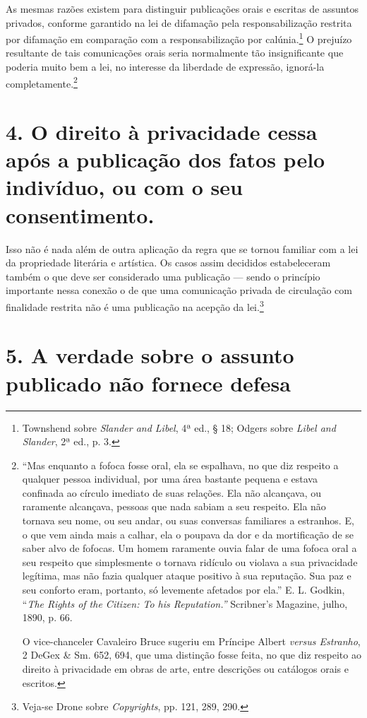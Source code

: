As mesmas razões existem para distinguir publicações orais e escritas de
assuntos privados, conforme garantido na lei de difamação pela
responsabilização restrita por difamação em comparação com a
responsabilização por calúnia.\footnote{Townshend sobre \emph{Slander
  and Libel}, 4ª ed., § 18; Odgers sobre \emph{Libel and Slander}, 2ª
  ed., p. 3.} O prejuízo resultante de tais comunicações orais seria
normalmente tão insignificante que poderia muito bem a lei, no interesse
da liberdade de expressão, ignorá-la completamente.\footnote{``Mas
  enquanto a fofoca fosse oral, ela se espalhava, no que diz respeito a
  qualquer pessoa individual, por uma área bastante pequena e estava
  confinada ao círculo imediato de suas relações. Ela não alcançava, ou
  raramente alcançava, pessoas que nada sabiam a seu respeito. Ela não
  tornava seu nome, ou seu andar, ou suas conversas familiares a
  estranhos. E, o que vem ainda mais a calhar, ela o poupava da dor e da
  mortificação de se saber alvo de fofocas. Um homem raramente ouvia
  falar de uma fofoca oral a seu respeito que simplesmente o tornava
  ridículo ou violava a sua privacidade legítima, mas não fazia qualquer
  ataque positivo à sua reputação. Sua paz e seu conforto eram,
  portanto, só levemente afetados por ela.'' E. L. Godkin, ``\emph{The
  Rights of the Citizen: To his Reputation.''} Scribner's Magazine,
  julho, 1890, p. 66.

  O vice-chanceler Cavaleiro Bruce sugeriu em Príncipe Albert
  \emph{versus Estranho}, 2 DeGex \& Sm. 652, 694, que uma distinção
  fosse feita, no que diz respeito ao direito à privacidade em obras de
  arte, entre descrições ou catálogos orais e escritos.}

\section{4. O direito à privacidade cessa após a publicação dos fatos
pelo indivíduo, ou com o seu consentimento.}

Isso não é nada além de outra aplicação da regra que se tornou familiar
com a lei da propriedade literária e artística. Os casos assim decididos
estabeleceram também o que deve ser considerado uma publicação --- sendo
o princípio importante nessa conexão o de que uma comunicação privada de
circulação com finalidade restrita não é uma publicação na acepção da
lei.\footnote{Veja-se Drone sobre \emph{Copyrights}, pp. 121, 289, 290.}

\section{5. A verdade sobre o assunto publicado não fornece defesa}

